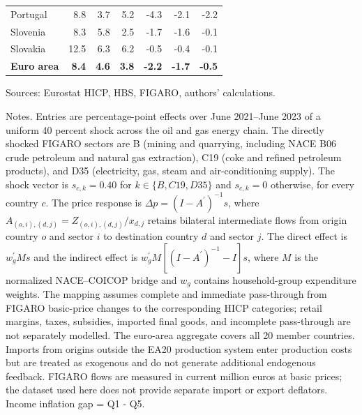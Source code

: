 \documentclass[11pt]{article}
\begin{document}
\begin{table}[H]
\begin{tabular}{lrrrrrr}
 \\
Portugal & 8.8 & 3.7 & 5.2 & -4.3 & -2.1 & -2.2
 \\
Slovenia & 8.3 & 5.8 & 2.5 & -1.7 & -1.6 & -0.1
 \\
Slovakia & 12.5 & 6.3 & 6.2 & -0.5 & -0.4 & -0.1
 \\
\midrule
\textbf{Euro area} & \textbf{8.4} & \textbf{4.6} & \textbf{3.8} & \textbf{-2.2} & \textbf{-1.7} & \textbf{-0.5}
 \\
\bottomrule
\end{tabular}
\par\vspace{0.35em}\footnotesize\noindent Sources: Eurostat HICP, HBS, FIGARO, authors' calculations.
\par\vspace{0.25em}\footnotesize\noindent Notes. Entries are percentage-point effects over June 2021--June 2023 of a uniform 40 percent shock across the oil and gas energy chain. The directly shocked FIGARO sectors are B (mining and quarrying, including NACE B06 crude petroleum and natural gas extraction), C19 (coke and refined petroleum products), and D35 (electricity, gas, steam and air-conditioning supply). The shock vector is $s_{c,k}=0.40$ for $k\in\{B,C19,D35\}$ and $s_{c,k}=0$ otherwise, for every country $c$. The price response is $\Delta p = (I - A^{\prime})^{-1}s$, where $A_{(o,i),(d,j)}=Z_{(o,i),(d,j)}/x_{d,j}$ retains bilateral intermediate flows from origin country $o$ and sector $i$ to destination country $d$ and sector $j$. The direct effect is $w_g^{\prime}Ms$ and the indirect effect is $w_g^{\prime}M[(I-A^{\prime})^{-1}-I]s$, where $M$ is the normalized NACE--COICOP bridge and $w_g$ contains household-group expenditure weights. The mapping assumes complete and immediate pass-through from FIGARO basic-price changes to the corresponding HICP categories; retail margins, taxes, subsidies, imported final goods, and incomplete pass-through are not separately modelled. The euro-area aggregate covers all 20 member countries. Imports from origins outside the EA20 production system enter production costs but are treated as exogenous and do not generate additional endogenous feedback. FIGARO flows are measured in current million euros at basic prices; the dataset used here does not provide separate import or export deflators. Income inflation gap = Q1 - Q5.
\end{table}
\vspace{0.6em}
\end{document}
